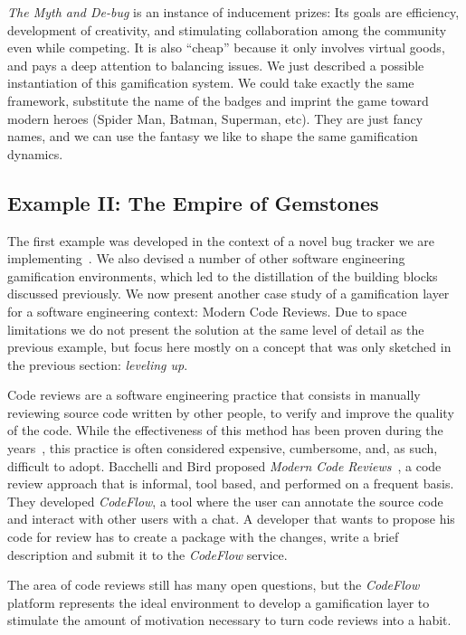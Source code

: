 \textit{The Myth and De-bug} is an instance of inducement prizes: Its goals are efficiency, development of creativity, and stimulating collaboration among the community even while competing.
It is also ``cheap'' because it only involves virtual goods, and pays a deep attention to balancing issues.
We just described a possible instantiation of this gamification system.
We could take exactly the same framework, substitute the name of the badges and imprint the game toward modern heroes (Spider Man, Batman, Superman, etc).
They are just fancy names, and we can use the fantasy we like to shape the same gamification dynamics.

\subsection{Example II: The Empire of Gemstones}\label{sec:gamification-example-gems}

The first example was developed in the context of a novel bug tracker we are implementing~\cite{DalS2014a}.
We also devised a number of other software engineering gamification environments, which led to the distillation of the building blocks discussed previously.
We now present another case study of a gamification layer for a software engineering context: Modern Code Reviews.
Due to space limitations we do not present the solution at the same level of detail as the previous example, but focus here mostly on a concept that was only sketched in the previous section: \emph{leveling up}.

Code reviews are a software engineering practice that consists in manually reviewing source code written by other people, to verify and improve the quality of the code.
While the effectiveness of this method has been proven during the years~\cite{Shull2008a}, this practice is often considered expensive, cumbersome, and, as such, difficult to adopt.
Bacchelli and Bird proposed \textit{Modern Code Reviews}~\cite{Bacc2013a}, a code review approach that is informal, tool based, and performed on a frequent basis.
They developed \textit{CodeFlow}, a tool where the user can annotate the source code and interact with other users with a chat.
A developer that wants to propose his code for review has to create a package with the changes, write a brief description and submit it to the \textit{CodeFlow} service.

The area of code reviews still has many open questions, but the \textit{CodeFlow} platform represents the ideal environment to develop a gamification layer to stimulate the amount of motivation necessary to turn code reviews into a habit.

